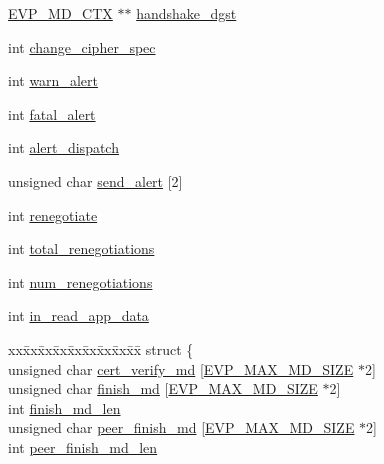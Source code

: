 \begin{DoxyCompactItemize}
\item 
\hyperlink{ossl__typ_8h_a69cda4d21bd068f01c469222c1dd92fe}{E\+V\+P\+\_\+\+M\+D\+\_\+\+C\+TX} $\ast$$\ast$ \hyperlink{structssl3__state__st_aa9d22197b1996616dea5bed29cab88b2}{handshake\+\_\+dgst}
\item 
int \hyperlink{structssl3__state__st_ac0fb72191ac2a2269adf2359e8d77382}{change\+\_\+cipher\+\_\+spec}
\item 
int \hyperlink{structssl3__state__st_ad1646ad8ddc960d735f8f9b6a3724f6b}{warn\+\_\+alert}
\item 
int \hyperlink{structssl3__state__st_ab01c5f2c4cc053af753e0d2a61c562cb}{fatal\+\_\+alert}
\item 
int \hyperlink{structssl3__state__st_a9534c71081335262df8e2f186a2b409b}{alert\+\_\+dispatch}
\item 
unsigned char \hyperlink{structssl3__state__st_a0afda55ccacf2d0f58fdc034c7d2b34b}{send\+\_\+alert} \mbox{[}2\mbox{]}
\item 
int \hyperlink{structssl3__state__st_af414cf3d9a29b6ae4974b4d0e69b5985}{renegotiate}
\item 
int \hyperlink{structssl3__state__st_ac3ed20859bef2774159c888b55778745}{total\+\_\+renegotiations}
\item 
int \hyperlink{structssl3__state__st_a29127aad172c73e45a03e42a9e42efde}{num\+\_\+renegotiations}
\item 
int \hyperlink{structssl3__state__st_a1d2b5815690302eea3a58775f24594e2}{in\+\_\+read\+\_\+app\+\_\+data}
\item 
\begin{tabbing}
xx\=xx\=xx\=xx\=xx\=xx\=xx\=xx\=xx\=\kill
struct \{\\
\>unsigned char \hyperlink{structssl3__state__st_a12aeb740d13d04f5348a87fa80968984}{cert\_verify\_md} \mbox{[}\hyperlink{evp_8h_a71bfc78a168f00f0c4ffd2535082b129}{EVP\_MAX\_MD\_SIZE} $\ast$2\mbox{]}\\
\>unsigned char \hyperlink{structssl3__state__st_a13a85dc9c38577f18415d6963d815632}{finish\_md} \mbox{[}\hyperlink{evp_8h_a71bfc78a168f00f0c4ffd2535082b129}{EVP\_MAX\_MD\_SIZE} $\ast$2\mbox{]}\\
\>int \hyperlink{structssl3__state__st_acf8315cae06ac9d844a3751942f78919}{finish\_md\_len}\\
\>unsigned char \hyperlink{structssl3__state__st_a820e7e25cf89b3b656234f187e6b40c3}{peer\_finish\_md} \mbox{[}\hyperlink{evp_8h_a71bfc78a168f00f0c4ffd2535082b129}{EVP\_MAX\_MD\_SIZE} $\ast$2\mbox{]}\\
\>int \hyperlink{structssl3__state__st_aaa38a18f4f0357ae9be2e29f596ff7ea}{peer\_finish\_md\_len}\\

\end{tabbing}$$
\end{DoxyCompactItemize}
